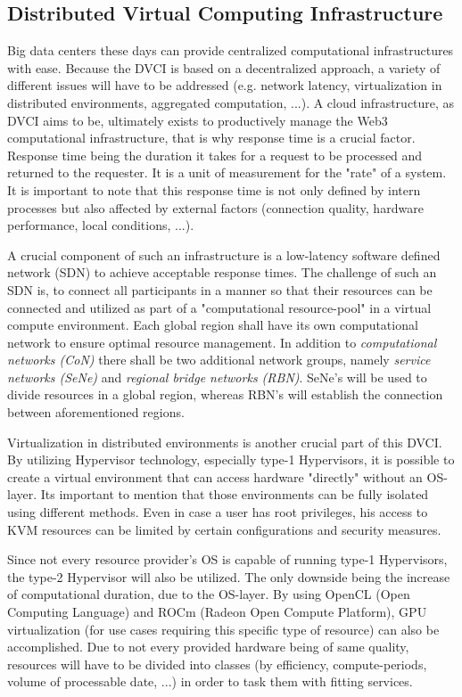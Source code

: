 \documentclass[]{article}
\begin{document}
\subsection{Distributed Virtual Computing Infrastructure}
Big data centers these days can provide centralized computational infrastructures with ease.
Because the DVCI is based on a decentralized approach, a variety of different issues will have to be addressed (e.g. network latency, virtualization in distributed environments, aggregated computation, ...).
A cloud infrastructure, as DVCI aims to be, ultimately exists to productively manage the Web3 computational infrastructure, that is why response time is a crucial factor. 
Response time being the duration it takes for a request to be processed and returned to the requester.
It is a unit of measurement for the "rate" of a system. 
It is important to note that this response time is not only defined by intern processes but also affected by external factors (connection quality, hardware performance, local conditions, ...).

A crucial component of such an infrastructure is a low-latency software defined network (SDN) to achieve acceptable response times.
The challenge of such an SDN is, to connect all participants in a manner so that their resources can be connected and utilized as part of a "computational resource-pool" in a virtual compute environment.
Each global region shall have its own computational network to ensure optimal resource management.
In addition to \textit{computational networks (CoN)} there shall be two additional network groups, namely \textit{service networks (SeNe)} and \textit{regional bridge networks (RBN)}.
SeNe's will be used to divide resources in a global region, whereas RBN's will establish the connection between aforementioned regions.

Virtualization in distributed environments is another crucial part of this DVCI.
By utilizing Hypervisor technology, especially type-1 Hypervisors, it is possible to create a virtual environment that can access hardware "directly" without an OS-layer.
Its important to mention that those environments can be fully isolated using different methods.
Even in case a user has root privileges, his access to KVM resources can be limited by certain configurations and security measures.

Since not every resource provider's OS is capable of running type-1 Hypervisors, the type-2 Hypervisor will also be utilized.
The only downside being the increase of computational duration, due to the OS-layer.
By using OpenCL (Open Computing Language) and ROCm (Radeon Open Compute Platform), GPU virtualization (for use cases requiring this specific type of resource) can also be accomplished.
Due to not every provided hardware being of same quality, resources will have to be divided into classes (by efficiency, compute-periods, volume of processable date, ...) in order to task them with fitting services.
\end{document}
